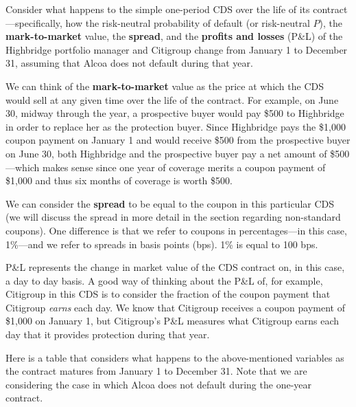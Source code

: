 \documentclass{jss}
\begin{document}
Consider what happens to the simple one-period CDS over the life of its contract---specifically, how the risk-neutral probability of default (or risk-neutral $P$), the \textbf{mark-to-market} value, the \textbf{spread}, and the \textbf{profits and losses} (P\&L) of the Highbridge portfolio manager and Citigroup change from January 1 to December 31, assuming that Alcoa does not default during that year.

We can think of the \textbf{mark-to-market} value as the price at which the CDS would sell at any given time over the life of the contract. For example, on June 30, midway through the year, a prospective buyer would pay \$500 to Highbridge in order to replace her as the protection buyer. Since Highbridge pays the \$1,000 coupon payment on January 1 and would receive \$500 from the prospective buyer on June 30, both Highbridge and the prospective buyer pay a net amount of \$500---which makes sense since one year of coverage merits a coupon payment of \$1,000 and thus six months of coverage is worth \$500. 

We can consider the \textbf{spread} to be equal to the coupon in this particular CDS (we will discuss the spread in more detail in the section regarding non-standard coupons). One difference is that we refer to coupons in percentages---in this case, 1\%---and we refer to spreads in basis points (bps). 1\% is equal to 100 bps.

P\&L represents the change in market value of the CDS contract on, in this case, a day to day basis. A good way of thinking about the P\&L of, for example, Citigroup in this CDS is to consider the fraction of the coupon payment that Citigroup \emph{earns} each day. We know that Citigroup receives a coupon payment of \$1,000 on January 1, but Citigroup's P\&L measures what Citigroup earns each day that it provides protection during that year.

Here is a table that considers what happens to the above-mentioned variables as the contract matures from January 1 to December 31. Note that we are considering the case in which Alcoa does not default during the one-year contract.
\end{document}
